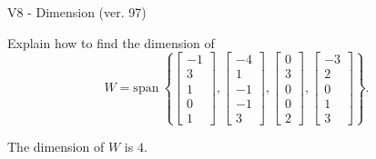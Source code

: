 \begin{exercise}
  \begin{exerciseTitle}V8 - Dimension (ver. 97)\end{exerciseTitle}
  \begin{exerciseStatement}
    Explain how to find the dimension of 
\[W=\mathrm{span}\ \left\{\left[\begin{array}{r}
-1 \\
3 \\
1 \\
0 \\
1
\end{array}\right] , \left[\begin{array}{r}
-4 \\
1 \\
-1 \\
-1 \\
3
\end{array}\right] , \left[\begin{array}{r}
0 \\
3 \\
0 \\
0 \\
2
\end{array}\right] , \left[\begin{array}{r}
-3 \\
2 \\
0 \\
1 \\
3
\end{array}\right]\right\}.\]



  \end{exerciseStatement}
  \begin{exerciseAnswer}
   The dimension of \(W\) is  \(4\).
  


  \end{exerciseAnswer}
\end{exercise}